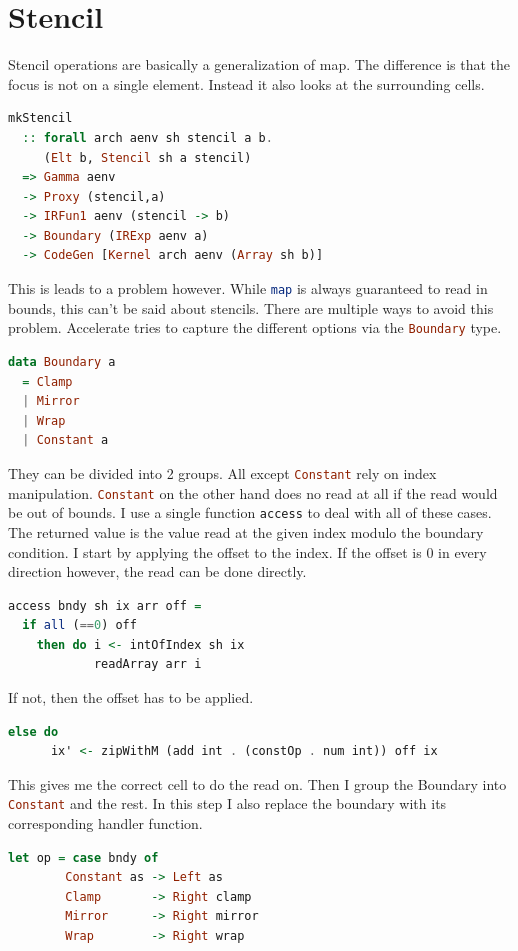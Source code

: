 \documentclass[a4paper,bibliography=totocnumbered,parskip,headsepline]{scrbook}
\begin{document}
\section{Stencil}
Stencil operations are basically a generalization of map.
The difference is that the focus is not on a single element.
Instead it also looks at the surrounding cells.

\begin{lstlisting}[language=haskell]
mkStencil 
  :: forall arch aenv sh stencil a b.
     (Elt b, Stencil sh a stencil)
  => Gamma aenv
  -> Proxy (stencil,a)
  -> IRFun1 aenv (stencil -> b)
  -> Boundary (IRExp aenv a)
  -> CodeGen [Kernel arch aenv (Array sh b)]
\end{lstlisting}

This is leads to a problem however.
While \lstinline[language=haskell]!map! is always guaranteed to read in bounds, this can't be said about stencils.
There are multiple ways to avoid this problem.
Accelerate tries to capture the different options via the \lstinline[language=haskell]!Boundary! type.
\begin{lstlisting}[language=haskell]
data Boundary a
  = Clamp
  | Mirror
  | Wrap
  | Constant a
\end{lstlisting}
They can be divided into 2 groups.
All except \lstinline[language=haskell]!Constant! rely on index manipulation.
\lstinline[language=haskell]!Constant! on the other hand does no read at all if the read would be out of bounds.
I use a single function \lstinline[language=haskell]!access! to deal with all of these cases.
The returned value is the value read at the given index modulo the boundary condition.
I start by applying the offset to the index.
If the offset is 0 in every direction however, the read can be done directly.
\begin{lstlisting}[language=haskell]
access bndy sh ix arr off =
  if all (==0) off
    then do i <- intOfIndex sh ix
            readArray arr i
\end{lstlisting}
If not, then the offset has to be applied.
\begin{lstlisting}[language=haskell]
    else do
      ix' <- zipWithM (add int . (constOp . num int)) off ix
\end{lstlisting}
This gives me the correct cell to do the read on.
Then I group the Boundary into \lstinline[language=haskell]!Constant! and the rest.
In this step I also replace the boundary with its corresponding handler function.
\begin{lstlisting}[language=haskell]
  let op = case bndy of
        Constant as -> Left as
        Clamp       -> Right clamp
        Mirror      -> Right mirror
        Wrap        -> Right wrap
\end{lstlisting}
\end{document}
